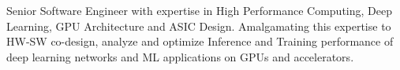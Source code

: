 

\begin{cvparagraph}

Senior Software Engineer with expertise in High Performance Computing, Deep Learning, GPU Architecture and ASIC Design. Amalgamating this expertise to HW-SW co-design, analyze and optimize Inference and Training performance of deep learning networks and ML applications on GPUs and accelerators.
\end{cvparagraph}
